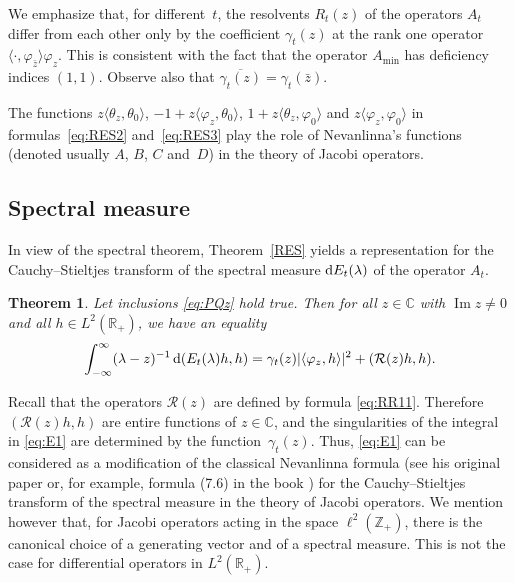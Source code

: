 \documentclass[pdftex]{sigma}%
\numberwithin{equation}{section}
\newtheorem{Theorem}{Theorem}[section]
\begin{document}
We emphasize that, for different~$t$, the resolvents $R_{t}(z)$ of the operators $A_{t}$ differ from each other only by the coefficient $\gamma_{t}(z)$ at the rank one operator $\langle\cdot, \varphi_{\bar{z}}\rangle \varphi_{z}$.
 This is consistent with the fact that the operator $A_{\min}$ has deficiency indices $(1,1)$.
 Observe also that
 $ \overline{\gamma_{t}(z)}= \gamma_t (\bar{z})$.

 The functions $z \langle \theta_{z}, \theta_{0}\rangle$, $-1 +z \langle \varphi_{z}, \theta_{0}\rangle$, $ 1+ z \langle \theta_{z}, \varphi_{0}\rangle$ and $z \langle \varphi_{z}, \varphi_{0}\rangle$ in formulas~\eqref{eq:RES2} and~\eqref{eq:RES3} play the role of Nevanlinna's functions (denoted usually $A$, $B$, $C$ and~$D$) in the theory of Jacobi operators.

\subsection{Spectral measure}\label{section3.3}

In view of the spectral theorem, Theorem~\ref{RES} yields a representation for the Cauchy--Stieltjes transform of the spectral measure ${\rm d}E_{t} (\lambda)$ of the operator $A_{t}$.

 \begin{Theorem}\label{RESc}
 Let inclusions \eqref{eq:PQz} hold true.
 Then for all $z\in {\mathbb C}$ with $\operatorname{Im} z\neq 0$ and all $h\in L^2 ({\mathbb R}_{+})$, we have an equality
 \begin{equation}
 \int_{-\infty}^\infty
 (\lambda-z)^{-1} \,{\rm d} (E_{t}(\lambda)h,h)= \gamma_{t} (z)|\langle \varphi_{z},h\rangle |^2 + ({\mathcal R}(z) h,h).
 \label{eq:E1}\end{equation}
 \end{Theorem}

 Recall that the operators ${\mathcal R}(z)$ are defined by formula \eqref{eq:RR11}. Therefore $({\mathcal R}(z) h,h)$ are entire functions of $z\in{\mathbb C}$, and the singularities of the integral in \eqref{eq:E1} are determined by the function~$\gamma_{t} (z)$. Thus, \eqref{eq:E1} can be considered as a modification of the classical Nevanlinna formula (see his original paper \cite{Nevan} or, for example, formula (7.6) in the book \cite{Schm}) for the Cauchy--Stieltjes transform of the spectral measure in the theory of Jacobi operators. We mention however that, for Jacobi operators acting in the space $\ell^2 ({\mathbb Z}_{+})$, there is the canonical choice of a generating vector and of a spectral measure. This is not the case for differential operators in $L^2 ({\mathbb R}_{+})$.
\end{document}
